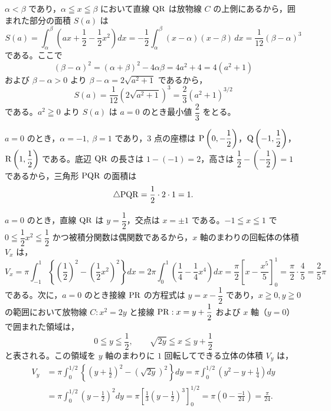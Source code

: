 
$\alpha<\beta$ であり，$\alpha\leqq x\leqq\beta$ において直線 $\mathrm{QR}$ は放物線 $C$ の上側にあるから，囲まれた部分の面積 $S(a)$ は
\[
  S(a) = \int_{\alpha}^{\beta}\left(ax+\frac{1}{2}-\frac{1}{2}x^{2}\right)dx
  = -\frac{1}{2}\int_{\alpha}^{\beta}(x-\alpha)(x-\beta)\,dx
  = \frac{1}{12}(\beta-\alpha)^{3}
\]
である。ここで
\[
  (\beta-\alpha)^{2} = (\alpha+\beta)^{2}-4\alpha\beta = 4a^{2}+4 = 4(a^{2}+1)
\]
および $\beta-\alpha>0$ より $\beta-\alpha=2\sqrt{a^{2}+1}$ であるから，
\[
  S(a) = \frac{1}{12}\left(2\sqrt{a^{2}+1}\right)^{3} = \frac{2}{3}(a^{2}+1)^{3/2}
\]
である。$a^{2}\geqq 0$ より $S(a)$ は $a=0$ のとき最小値 $\dfrac{2}{3}$ をとる。

$a=0$ のとき，$\alpha=-1,\ \beta=1$ であり，$3$ 点の座標は $\mathrm{P}\left(0, -\dfrac{1}{2}\right)$，$\mathrm{Q}\left(-1, \dfrac{1}{2}\right)$，$\mathrm{R}\left(1, \dfrac{1}{2}\right)$ である。底辺 $\mathrm{QR}$ の長さは $1-(-1)=2$，高さは $\dfrac{1}{2}-\left(-\dfrac{1}{2}\right)=1$ であるから，三角形 $\mathrm{PQR}$ の面積は
\[
  \triangle\mathrm{PQR} = \frac{1}{2}\cdot 2\cdot 1 = 1.
\]


$a=0$ のとき，直線 $\mathrm{QR}$ は $y=\dfrac{1}{2}$，交点は $x=\pm 1$ である。$-1\leqq x\leqq 1$ で $0\leqq\dfrac{1}{2}x^{2}\leqq\dfrac{1}{2}$ かつ被積分関数は偶関数であるから，$x$ 軸のまわりの回転体の体積 $V_{x}$ は，
\[
  V_{x} = \pi\int_{-1}^{1}\left\{\left(\frac{1}{2}\right)^{2}-\left(\frac{1}{2}x^{2}\right)^{2}\right\}dx
  = 2\pi\int_{0}^{1}\left(\frac{1}{4}-\frac{1}{4}x^{4}\right)dx
  = \frac{\pi}{2}\left[x-\frac{x^{5}}{5}\right]_{0}^{1}
  = \frac{\pi}{2}\cdot\frac{4}{5} = \frac{2}{5}\pi
\]
である。次に，$a=0$ のとき接線 $\mathrm{PR}$ の方程式は $y=x-\dfrac{1}{2}$ であり，$x\geqq 0, y\geqq 0$ の範囲において放物線 $C: x^{2}=2y$ と接線 $\mathrm{PR}: x=y+\dfrac{1}{2}$ および $x$ 軸（$y=0$）で囲まれた領域は，
\[
  0 \leqq y \leqq \frac{1}{2},\qquad \sqrt{2y} \leqq x \leqq y + \frac{1}{2}
\]
と表される。この領域を $y$ 軸のまわりに $1$ 回転してできる立体の体積 $V_{y}$ は，
\begin{align*}
  V_{y} &= \pi\int_{0}^{1/2}\left\{\left(y+\frac{1}{2}\right)^{2} - \left(\sqrt{2y}\right)^{2}\right\}dy
  = \pi\int_{0}^{1/2}\left(y^{2}-y+\frac{1}{4}\right)dy \\
  &= \pi\int_{0}^{1/2}\left(y-\frac{1}{2}\right)^{2}dy
  = \pi\left[\frac{1}{3}\left(y-\frac{1}{2}\right)^{3}\right]_{0}^{1/2}
  = \pi\left(0 - \frac{-1}{24}\right) = \frac{\pi}{24}.
\end{align*}

